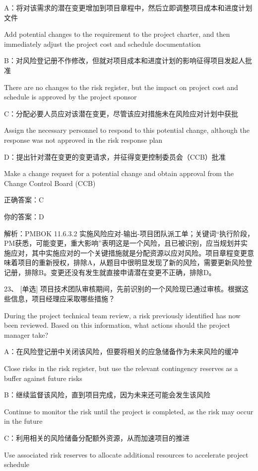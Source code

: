 A：将对该需求的潜在变更增加到项目章程中，然后立即调整项目成本和进度计划文件

Add potential changes to the requirement to the project charter, and then immediately adjust the project cost and schedule documentation

B：对风险登记册不作修改，但就对项目成本和进度计划的影响征得项目发起人批准

There are no changes to the risk register, but the impact on project cost and schedule is approved by the project sponsor

C：分配必要人员应对该潜在变更，尽管该应对措施未在风险应对计划中获批

Assign the necessary personnel to respond to this potential change, although the response was not approved in the risk response plan

D：提出针对潜在变更的变更请求，并征得变更控制委员会（CCB）批准

Make a change request for a potential change and obtain approval from the Change Control Board (CCB)

正确答案：C

你的答案：D

解析：PMBOK 11.6.3.2 实施风险应对-输出-项目团队派工单；关键词“执行阶段，PM获悉，可能变更，重大影响”表明这是一个风险，且已被识别，应当规划并实施应对，其中实施应对的一个关键措施就是分配资源以应对风险。项目章程变更意味着项目的重新授权，排除A，从题目中很明显发现了新的风险，需要更新风险登记册，排除B。变更还没有发生就直接申请潜在变更不正确，排除D。



23、 [单选] 项目技术团队审核期间，先前识别的一个风险现已通过审核。根据这些信息，项目经理应采取哪些措施？

During the project technical team review, a risk previously identified has now been reviewed. Based on this information, what actions should the project manager take?

A：在风险登记册中关闭该风险，但要将相关的应急储备作为未来风险的缓冲

Close risks in the risk register, but use the relevant contingency reserves as a buffer against future risks

B：继续监督该风险，直到项目完成，因为未来还可能会发生该风险

Continue to monitor the risk until the project is completed, as the risk may occur in the future

C：利用相关的风险储备分配额外资源，从而加速项目的推进

Use associated risk reserves to allocate additional resources to accelerate project schedule

